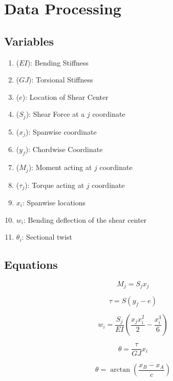 \documentclass{article}
\begin{document}
\section{Data Processing}
\subsection*{Variables}
\begin{enumerate}[label = \roman*.]
  \item (\(EI\)): Bending Stiffness
  \item (\(GJ\)): Torsional Stiffness
  \item (\(e\)): Location of Shear Center
  \item (\(S_{j}\)): Shear Force at a \(j\) coordinate
  \item (\(x_{j}\)): Spanwise coordinate
  \item (\(y_{f}\)): Chordwise Coordinate
  \item (\(M_{j}\)): Moment acting at \(j\) coordinate
  \item (\(\tau_{j}\)): Torque acting at \(j\) coordinate
  \item \(x_{i}\): Spanwise locations 
  \item \(w_{i}\): Bending deflection of the shear center 
  \item \(\theta_{i}\): Sectional twist 
\end{enumerate}

\subsection*{Equations}

\begin{equation}
  M_j = S_j x_j
  \label{eq:bendingmoment}
\end{equation}

\begin{equation}
  \tau = S(y_f - e)
  \label{eq:torque}
\end{equation}

\begin{equation}
  w_i = \frac{S_j}{EI} \left( \frac{x_j x_i^2}{2} - \frac{x_i^3}{6} \right)
  \label{eq:bendingdeflection}
\end{equation}

\begin{equation}
  \theta = \frac{\tau}{GJ} x_i
  \label{eq:twistangle}
\end{equation}

\begin{equation}
  \theta = \arctan \left( \frac{x_B - x_A}{c} \right)
  \label{eq:theta}
\end{equation}
\end{document}

